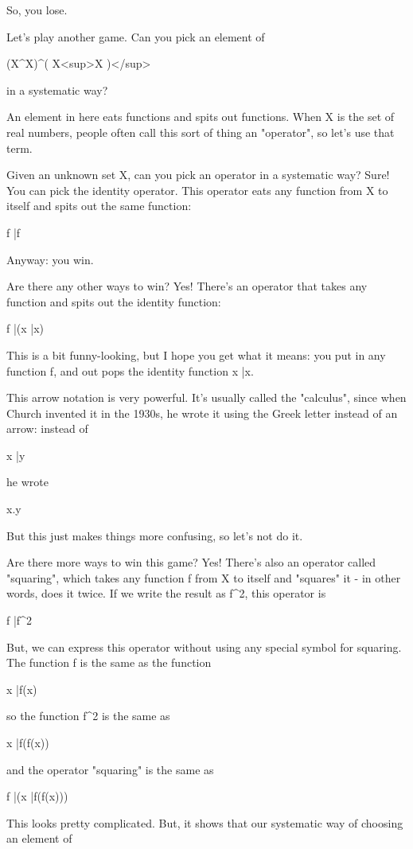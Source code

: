 So, you lose.

Let's play another game.  Can you pick an element of 

(X^{X})^{( X<sup>X} )</sup>

in a systematic way?  

An element in here eats functions and spits out functions.  When X is
the set of real numbers, people often call this sort of thing an 
"operator", so let's use that term.  

Given an unknown set X, can you pick an operator in a systematic
way?  Sure!  You can pick the identity operator.  This operator 
eats any function from X to itself and spits out the same function:

f |\to  f

Anyway: you win.

Are there any other ways to win?  Yes!  There's an operator that
takes any function and spits out the identity function:

f |\to  (x |\to  x)

This is a bit funny-looking, but I hope you get what it means: you
put in any function f, and out pops the identity function x |\to  x.

This arrow notation is very powerful.  It's usually called the 
"\lambda  calculus", since when Church invented it in the 1930s, he 
wrote it using the Greek letter \lambda  instead of an arrow: instead of 

x |\to  y

he wrote

\lambda  x.y

But this just makes things more confusing, so let's not do it.

Are there more ways to win this game?  Yes!  There's also an operator
called "squaring", which takes any function f from X to itself 
and "squares" it - in other words, does it twice.  If we write
the result as f^{2}, this operator is

f |\to  f^{2}

But, we can express this operator without using any special symbol
for squaring.  The function f is the same as the function

x |\to  f(x)

so the function f^{2} is the same as

x |\to  f(f(x))

and the operator "squaring" is the same as

f |\to  (x |\to  f(f(x)))

This looks pretty complicated.  But, it shows that our systematic
way of choosing an element of 

